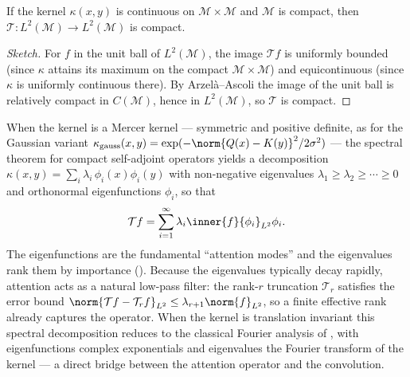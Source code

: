 \begin{proposition}
\label{prop:apps:attn-compact}
If the kernel $\kappa(x,y)$ is continuous on $\mathcal{M}\times\mathcal{M}$ and
$\mathcal{M}$ is compact, then $\mathcal{T}: L^2(\mathcal{M})\to L^2(\mathcal{M})$
is compact.
\end{proposition}

\begin{proof}[Sketch]
For $f$ in the unit ball of $L^2(\mathcal{M})$, the image $\mathcal{T}f$ is
uniformly bounded (since $\kappa$ attains its maximum on the compact
$\mathcal{M}\times\mathcal{M}$) and equicontinuous (since $\kappa$ is uniformly
continuous there). By Arzel\`a--Ascoli the image of the unit ball is relatively
compact in $C(\mathcal{M})$, hence in $L^2(\mathcal{M})$, so $\mathcal{T}$ is
compact.
\end{proof}

When the kernel is a Mercer kernel --- symmetric and positive definite, as for
the Gaussian variant
$\kappa_{\text{gauss}}(x,y) = \exp(-\norm{Q(x)-K(y)}^2/2\sigma^2)$ --- the
spectral theorem for compact self-adjoint operators yields a decomposition
$\kappa(x,y) = \sum_{i} \lambda_i\,\phi_i(x)\phi_i(y)$ with non-negative
eigenvalues $\lambda_1\ge\lambda_2\ge\cdots\ge 0$ and orthonormal eigenfunctions
$\phi_i$, so that
\[
  \mathcal{T}f = \sum_{i=1}^{\infty}\lambda_i \inner{f}{\phi_i}_{L^2}\phi_i .
\]
The eigenfunctions are the fundamental ``attention modes'' and the eigenvalues
rank them by importance (). Because the eigenvalues
typically decay rapidly, attention acts as a natural low-pass filter: the
rank-$r$ truncation $\mathcal{T}_r$ satisfies the error bound
$\norm{\mathcal{T}f - \mathcal{T}_r f}_{L^2}\le \lambda_{r+1}\norm{f}_{L^2}$, so
a finite effective rank already captures the operator. When the kernel is
translation invariant this spectral decomposition reduces to the classical
Fourier analysis of , with eigenfunctions complex exponentials
and eigenvalues the Fourier transform of the kernel --- a direct bridge between
the attention operator and the convolution.

